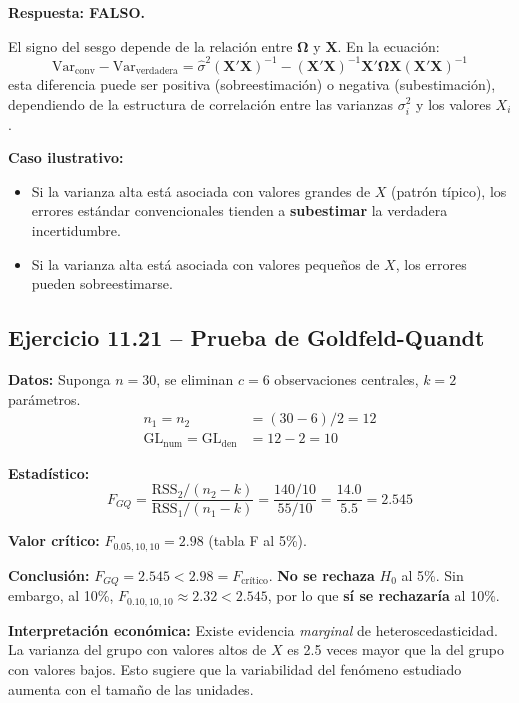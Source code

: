 \documentclass[12pt,a4paper]{report}
\theoremstyle{definition}
\theoremstyle{remark}
\newcommand{\Var}{\mathrm{Var}}
\newcommand{\sigmahat}{\hat{\sigma}}
\begin{document}
\begin{tcolorbox}[ejerciciostyle, title={Ejercicio 11.1 (c): ``MCO siempre sobreestima los errores estándar''}]
  \textbf{Respuesta: FALSO.}

  El signo del sesgo depende de la relación entre $\boldsymbol{\Omega}$ y $\mathbf{X}$. En la ecuación:
  \begin{equation*}
    \Var_{\text{conv}} - \Var_{\text{verdadera}} = \sigmahat^2(\mathbf{X}'\mathbf{X})^{-1} - (\mathbf{X}'\mathbf{X})^{-1}\mathbf{X}'\boldsymbol{\Omega}\mathbf{X}(\mathbf{X}'\mathbf{X})^{-1}
  \end{equation*}
  esta diferencia puede ser positiva (sobreestimación) o negativa (subestimación), dependiendo de la estructura de correlación entre las varianzas $\sigma_i^2$ y los valores $X_i$.

  \textbf{Caso ilustrativo:}
  \begin{itemize}
    \item Si la varianza alta está asociada con valores grandes de $X$ (patrón típico), los errores estándar convencionales tienden a \textbf{subestimar} la verdadera incertidumbre.
    \item Si la varianza alta está asociada con valores pequeños de $X$, los errores pueden sobreestimarse.
  \end{itemize}
\end{tcolorbox}

\subsection{Ejercicio 11.21 -- Prueba de Goldfeld-Quandt}

\begin{tcolorbox}[ejerciciostyle, title={Ejercicio 11.21: Datos dados $\text{RSS}_1 = 55$, $\text{RSS}_2 = 140$}]
  \textbf{Datos:} Suponga $n = 30$, se eliminan $c = 6$ observaciones centrales, $k = 2$ parámetros.
  \begin{align*}
    n_1 = n_2 &= (30 - 6)/2 = 12\\
    \text{GL}_{\text{num}} = \text{GL}_{\text{den}} &= 12 - 2 = 10
  \end{align*}

  \textbf{Estadístico:}
  \begin{equation*}
    F_{GQ} = \frac{\text{RSS}_2 / (n_2 - k)}{\text{RSS}_1 / (n_1 - k)} = \frac{140/10}{55/10} = \frac{14.0}{5.5} = 2.545
  \end{equation*}

  \textbf{Valor crítico:} $F_{0.05, 10, 10} = 2.98$ (tabla F al 5\%).

  \textbf{Conclusión:} $F_{GQ} = 2.545 < 2.98 = F_{\text{crítico}}$. \textbf{No se rechaza} $H_0$ al 5\%. Sin embargo, al 10\%, $F_{0.10, 10, 10} \approx 2.32 < 2.545$, por lo que \textbf{sí se rechazaría} al 10\%.

  \textbf{Interpretación económica:} Existe evidencia \textit{marginal} de heteroscedasticidad. La varianza del grupo con valores altos de $X$ es 2.5 veces mayor que la del grupo con valores bajos. Esto sugiere que la variabilidad del fenómeno estudiado aumenta con el tamaño de las unidades.
\end{tcolorbox}
\end{document}
